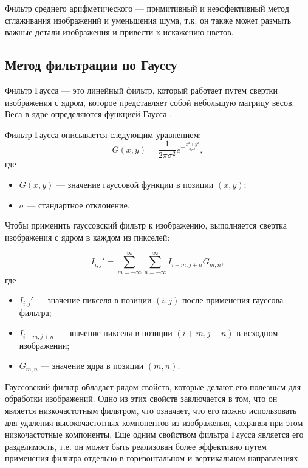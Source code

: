 Фильтр среднего арифметического --- примитивный и неэффективный метод сглаживания изображений и уменьшения шума, т.к. он также может размыть важные детали изображения и привести к искажению цветов. 

\subsection{Метод фильтрации по Гауссу}
Фильтр Гаусса --- это линейный фильтр, который работает путем свертки изображения с ядром, которое представляет собой небольшую матрицу весов. Веса в ядре определяются функцией Гаусса \cite{gaussianfilter}.

Фильтр Гаусса описывается следующим уравнением:
\begin{equation}
    G(x,y) = \frac{1}{2\pi\sigma^2}e^{-\frac{x^2+y^2}{2\sigma^2}},
\end{equation}
где 
\begin{itemize}
    \item $G(x,y)$ --- значение гауссовой функции в позиции $(x,y)$;
    \item $\sigma$ --- стандартное отклонение.
\end{itemize}

Чтобы применить гауссовский фильтр к изображению, выполняется свертка изображения с ядром в каждом из пикселей:

\begin{equation}
I_{i,j}' = \sum_{m=-\infty}^{\infty} \sum_{n=-\infty}^{\infty} I_{i+m,j+n} G_{m,n},
\end{equation}
где 
\begin{itemize}
    \item $I_{i,j}'$ --- значение пикселя в позиции $(i,j)$ после применения гауссова фильтра;
    \item $I_{i+m,j+n}$ --- значение пикселя в позиции $(i+m,j+n)$ в исходном изображении;
    \item $G_{m,n}$ --- значение ядра в позиции $(m,n)$.
\end{itemize}

Гауссовский фильтр обладает рядом свойств, которые делают его полезным для обработки изображений. Одно из этих свойств заключается в том, что он является низкочастотным фильтром, что означает, что его можно использовать для удаления высокочастотных компонентов из изображения, сохраняя при этом низкочастотные компоненты. Еще одним свойством фильтра Гаусса является его разделимость, т.е. он может быть реализован более эффективно путем применения фильтра отдельно в горизонтальном и вертикальном направлениях.

